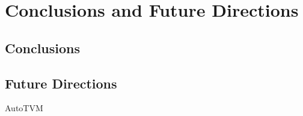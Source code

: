 \section{Conclusions and Future Directions}
\label{sec:conclude}

\subsection{Conclusions}

\subsection{Future Directions}

AutoTVM
